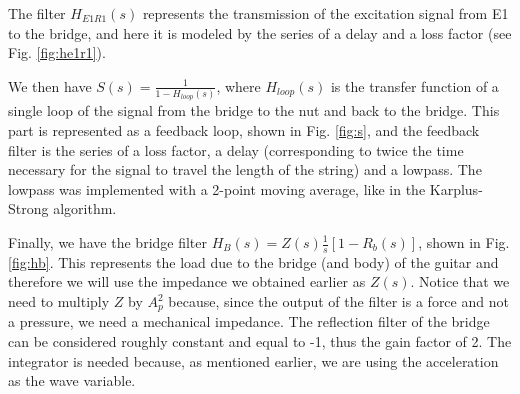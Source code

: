 \documentclass[a4paper]{article}
\begin{document}
The filter $H_{E1R1}(s)$ represents the transmission of the excitation signal from E1 to the bridge, and here it is modeled by the series of a delay and a loss factor (see Fig. \ref{fig:he1r1}).

We then have $S(s) = \frac{1}{1 - H_{loop}(s)}$, where $H_{loop}(s)$ is the transfer function of a single loop of the signal from the bridge to the nut and back to the bridge. This part is represented as a feedback loop, shown in Fig. \ref{fig:s}, and the feedback filter is the series of a loss factor, a delay (corresponding to twice the time necessary for the signal to travel the length of the string) and a lowpass. The lowpass was implemented with a 2-point moving average, like in the Karplus-Strong algorithm.

Finally, we have the bridge filter $H_B(s) = Z(s)\frac{1}{s} \left[ 1 - R_b(s) \right]$, shown in Fig. \ref{fig:hb}. This represents the load due to the bridge (and body) of the guitar and therefore we will use the impedance we obtained earlier as $Z(s)$. Notice that we need to multiply $Z$ by $A_p^2$ because, since the output of the filter is a force and not a pressure, we need a mechanical impedance. The reflection filter of the bridge can be considered roughly constant and equal to -1, thus the gain factor of 2. The integrator is needed because, as mentioned earlier, we are using the acceleration as the wave variable.
\end{document}
